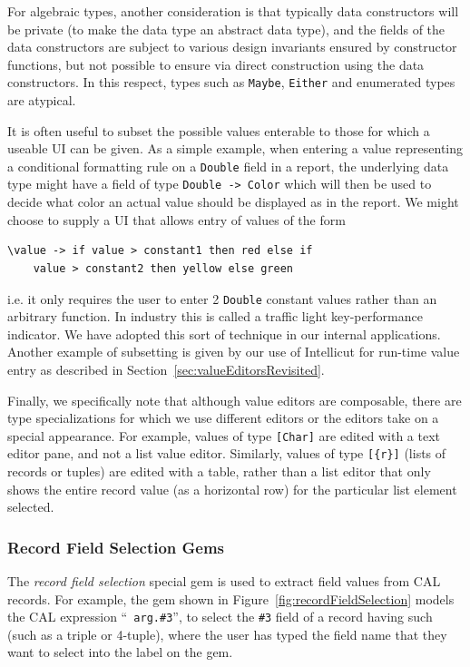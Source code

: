 \documentclass[preprint]{sigplanconf}
\begin{document}
For algebraic types, another consideration is that typically data constructors will be private 
(to make the data type an abstract data type), and the fields of the data constructors
are subject to various design invariants ensured by constructor functions, but not possible
to ensure via direct construction using the data constructors. In this respect, types
such as {\tt Maybe}, {\tt Either} and enumerated types are atypical.

It is often useful to subset the possible values enterable to those for which
a useable UI can be given. As a simple example, when entering a value representing a conditional
formatting rule on a {\tt Double} field in a report, the underlying data type might have a field
of type {\tt Double -> Color} which will then be used to decide what color an actual value should
be displayed as in the report. We might choose to supply a UI that allows entry of values of
the form 
\begin{verbatim}
\value -> if value > constant1 then red else if
    value > constant2 then yellow else green
\end{verbatim}
i.e. it only requires the user to enter 2 {\tt Double} constant values rather than an arbitrary function.
In industry this is called a traffic light key-performance indicator. We have adopted this sort of technique
in our internal applications. Another example of subsetting is given by our use of Intellicut for run-time value
entry as described in Section~\ref{sec:valueEditorsRevisited}.

Finally, we specifically note that although value editors are composable, there are type specializations
for which we use different editors or the editors take on a special appearance. For example, values of type
{\tt [Char]} are edited with a text editor pane, and not a list value editor.
Similarly, values of type {\tt [\{r\}]} (lists of records or tuples) are edited with a table, rather than a list editor that
only shows the entire record value (as a horizontal row) for the particular list element selected.

\subsubsection{Record Field Selection Gems}
\label{sec:recordFieldSelectionGems}

The {\it record field selection} special gem is used to extract field values
from CAL records. For example, the gem shown in Figure~\ref{fig:recordFieldSelection} models the CAL expression ``{\tt
arg.\#3}'', to select the {\tt \#3} field of a record having such (such as a
triple or 4-tuple), where the user has typed the field name that they
want to select into the label on the gem.
\end{document}
